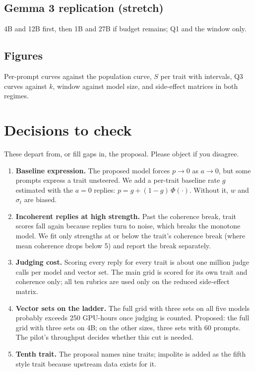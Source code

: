 \documentclass[11pt]{article}
\begin{document}
\subsection{Gemma 3 replication (stretch)}
4B and 12B first, then 1B and 27B if budget remains; Q1 and the window only.

\subsection{Figures}
Per-prompt curves against the population curve, $S$ per trait with intervals,
Q3 curves against $k$, window against model size, and side-effect matrices in
both regimes.

\section{Decisions to check}

These depart from, or fill gaps in, the proposal. Please object if you
disagree.

\begin{enumerate}
  \item \textbf{Baseline expression.} The proposed model forces $p \to 0$ as
        $a \to 0$, but some prompts express a trait unsteered. We add a
        per-trait baseline rate $g$ estimated with the $a = 0$ replies:
        $p = g + (1 - g)\,\Phi(\cdot)$. Without it, $w$ and $\sigma_t$ are
        biased.
  \item \textbf{Incoherent replies at high strength.} Past the coherence
        break, trait scores fall again because replies turn to noise, which
        breaks the monotone model. We fit only strengths at or below the
        trait's coherence break (where mean coherence drops below 5) and report
        the break separately.
  \item \textbf{Judging cost.} Scoring every reply for every trait is about one
        million judge calls per model and vector set. The main grid is scored
        for its own trait and coherence only; all ten rubrics are used only on
        the reduced side-effect matrix.
  \item \textbf{Vector sets on the ladder.} The full grid with three sets on
        all five models probably exceeds 250 GPU-hours once judging is counted.
        Proposed: the full grid with three sets on 4B; on the other sizes,
        three sets with 60 prompts. The pilot's throughput decides whether
        this cut is needed.
  \item \textbf{Tenth trait.} The proposal names nine traits; impolite is
        added as the fifth style trait because upstream data exists for it.
\end{enumerate}
\end{document}
